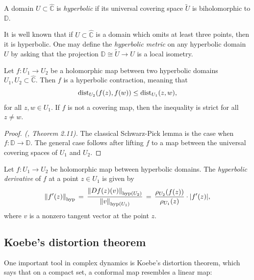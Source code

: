\begin{definition}
	A domain $U \subset \widehat{\mathbb C}$ is \emph{hyperbolic} if its 
	universal covering space $\widetilde U$ is biholomorphic to $\mathbb D$.
\end{definition}

It is well known that if $U \subset \widehat{\mathbb C}$ is a domain which omits at least three points, then it is hyperbolic.
One may define the \emph{hyperbolic metric} on any hyperbolic domain $U$ by asking that the projection 
	$\mathbb{D} \cong \widetilde U \to U$ is a local isometry.

\begin{theorem} \label{thm:Schwarz}
	Let $f:U_1 \to U_2$ be a holomorphic map between two hyperbolic domains $U_1,U_2 \subset \widehat{\mathbb C}$.
	Then $f$ is a hyperbolic contraction, meaning that
	\begin{equation}
		\operatorname{dist}_{U_2}(f(z),f(w)) \leq \operatorname{dist}_{U_1} (z,w),
	\end{equation}
	for all $z,w \in U_1$. If $f$ is not a covering map, then the inequality is strict for all $z \neq w$.
\end{theorem}

\begin{proof}[Proof. (\cite{milnor_book}, Theorem 2.11)]
	The classical Schwarz-Pick lemma is the case when $f:\mathbb D \to \mathbb D$.
	The general case follows after lifting $f$ to a map between the universal covering spaces of $U_1$ and $U_2$.
\end{proof}

\begin{definition}
	Let $f:U_1\to U_2$ be holomorphic map between hyperbolic domains. The \emph{hyperbolic derivative} of $f$ at a point $z \in U_1$ 
	is given by
	\begin{equation} \label{def:hyp-derivative}
		\left\Vert f'(z)\right\Vert_{\operatorname{hyp}} \, = \, 
		\frac{\left\Vert Df(z)(v)\right\Vert_{\operatorname{hyp}(U_2)}}
		{\left\Vert v\right\Vert_{\operatorname{hyp}(U_1)}}
		\, = \, \frac{\rho_{U_2}(f(z))}{\rho_{U_1}(z)} \cdot |f'(z)|, 
	\end{equation}
	where $v$ is a nonzero tangent vector at the point $z$.
\end{definition}

\subsection{Koebe's distortion theorem}
One important tool in complex dynamics is Koebe's distortion theorem, which says that on a compact set, a conformal map resembles a linear map:

